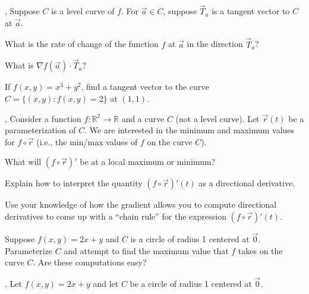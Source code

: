 \documentclass[letter]{article}
\newcommand{\R}{\mathbb{R}}
\renewcommand{\emph}[1]{{\color{defcolor} \textbf{\textit{##1}}}}
\begin{document}
	\sep
	Suppose $C$ is a level curve of $f$.  For $\vec a\in C$, suppose $\vec T_a$ is a tangent vector to
	$C$ at $\vec a$.
	\begin{Enum}
		\item What is the rate of change of the function $f$ at $\vec a$ in the direction $\vec T_a$?
		\item What is $\nabla f(\vec a)\cdot \vec T_a$?
		\item If $f(x,y)=x^3+y^2$, find a tangent vector to the curve $C=\{(x,y):f(x,y)=2\}$ at $(1,1)$.
	\end{Enum}

	\sep
	Consider a function $f:\R^2\to \R$ and a curve $C$ (not a level curve).  Let $\vec r(t)$
	be a parameterization of $C$.  We are interested in the minimum and maximum values for 
	$f\circ \vec r$ (i.e., the min/max values of $f$ on the curve $C$).
	\begin{Enum}
		\item What will $(f\circ \vec r)'$ be at a local maximum or minimum?
		\item Explain how to interpret the quantity $(f\circ \vec r)'(t)$
			as a directional derivative.
		\item Use your knowledge of how the gradient allows you to compute directional derivatives
			to come up with a ``chain rule'' for the expression $(f\circ \vec r)'(t)$.
		\item Suppose $f(x,y) = 2x+y$ and $C$ is a circle of radius 1 centered at $\vec 0$.
			Parameterize $C$ and attempt to find the maximum value that $f$ takes on the curve $C$.
			Are these computations easy?
	\end{Enum}

	\sep
	Let $f(x,y)=2x+y$ and let $C$ be a circle of radius 1 centered at $\vec 0$.
\end{document}
